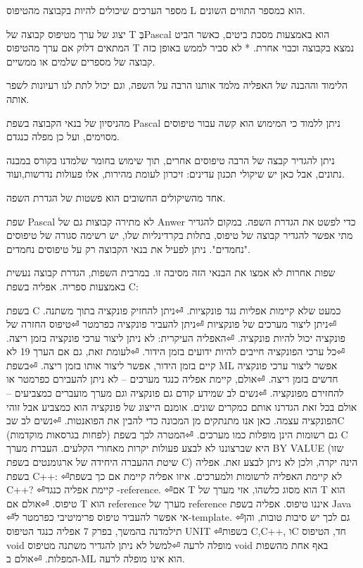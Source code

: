       \begin{ציינון}
\item מספר הערכים שיכולים להיות בקבוצה מהטיפוס L הוא כמספר התווים השונים.
\item יצוג של ערך
      מטיפוס קבוצה של
      T בְּPascal הוא
      באמצעות מסכת
      ביטים, כאשר הביט
      המתאים דלוק אם
      ערך מהטיפוס T
      נמצא בקבוצה
      וכבוי אחרת. *
      לא סביר לממש
      באופן כזה קבוצה
      של מספרים שלמים
      או ממשיים.
\item הלימוד וההבנה של האפליה מלמד אותנו הרבה על השפה, וגם יכול לתת לנו רעיונות לשפר אותה.
\item מהניסיון של בנאי הקבוצה בשפת Pascal ניתן ללמוד כי המימוש הוא קשה עבור טיפוסים מסוימים, ועל כן מפלה כנגדם.
\item ניתן להגדיר קבצה של הרבה טיפוסים אחרים, תוך שימוש בחומר שלמדנו בקורס במבנה נתונים, אבל כאן יש שיקולי תכנון עדינים: זיכרון לעומת מהירות, אלו פעולות נדרשות,ועוד.
\item אחד מהשיקולים החשובים הוא פשטות של הגדרת השפה.
\item שפת Pascal לא מתירה קבוצות גם של Anwer כדי לפשט את הגדרת השפה. במקום להגדיר מתי אפשר להגדיר קבוצה של טיפוס, בתלות בקרדינליות שלו, יש רשימה סגורה של טיפוסים "נחמדים". ניתן לפעיל את בנאי הקבוצה רק על טיפוסים נחמדים.
\item שפות אחרות לא אמצו את הבנאי הזה מסיבה זו. במרבית השפות, הגדרת קבוצה נעשית באמצעות ספריה.
      אפליה בשפת C:
\item בשפת C כמעט שלא קיימות אפליות נגד פונקציות.
⏎ניתן להחזיק פונקציה בתוך משתנה.
⏎ניתן ליצור מערכים של פונקציות
⏎ניתן להעביר פונקציה כפרמטר
⏎טיפוס החזרה של פונקציה יכול להיות פונקציה.
⏎האפליה העיקרית: לא ניתן ליצור ערכי פונקציה בזמן ריצה.
⏎כל ערכי הפונקציה חייבים להיות ידועים בזמן הידור.
⏎לעומת זאת, גם אם הערך 19 לא קיים בזמן הידור, אפשר ליצור אותו בזמן ריצה.
⏎בשפת ML אפשר ליצור ערכי פונקציה חדשים בזמן ריצה.
⏎אולם, קיימת אפליה כנגד מערכים – לא ניתן להעבירם כפרמטר או להחזירם מפונקציה.
⏎נשים לב שמידע קודם גם פונקציה וגם מערך מועברים כמצביעים – אולם בכל זאת הגדרנו אותם כמקרים שונים. אומנם הייצוג של פונקציה הוא כמצביע אבל זוהי הפונקציה עצמה. כאן אנו מתנתקים מן המכונה כדי להבין את הפואנטות.
⏎נשים לב שבC (לפחות בגרסאות מוקדמות) גם רשומות הינן מופלות כמו מערכים.
⏎המטרה לכך בשפת C היא שברצוננו לא לבצע פעולות יקרות מאחורי הקלעים. העברת מערך BY VALUE (שזו שיטת ההעברה היחידה של ארגומנטים בשפת C) הינה יקרה, ולכן לא ניתן לבצע זאת.
      אפליה בשפת C++:
⏎לא קיימת האפליה לרשומות ולמערכים. איזו אפליה קיימת אם כך בשפת C++?
⏎קיימת אפליה כנגד -reference.
⏎אם T הוא מסוג כלשהו, אזי מערך של T הוא טיפוס.
⏎אולם אם T הוא reference מערך של reference איננו טיפוס.
      אפליה בשפת Java
⏎אי אפשר להעביר טיפוס פרימיטיבי כפרמטר ל-template.
⏎גם לכך יש סיבות טובות, והן תילמדנה בהמשך, בפרק 7
      אפליה כנגד הטיפוס UNIT
⏎בשפות C,C++, וC חד, הטיפוס void מופלה לרעה
⏎למשל לא ניתן להגדיר משתנה מטיפוס void באף אחת מהשפות המפלות.
⏎אולם ב-ML הוא אינו מופלה לרעה.
    \end{ציינון}

